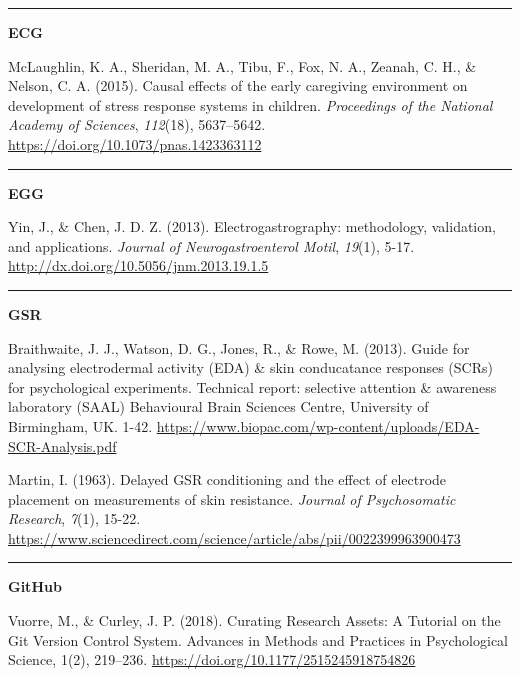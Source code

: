 \documentclass[]{book}
\begin{document}
\begin{center}\rule{0.5\linewidth}{0.5pt}\end{center}

\textbf{ECG}

McLaughlin, K. A., Sheridan, M. A., Tibu, F., Fox, N. A., Zeanah, C. H., \& Nelson, C. A. (2015). Causal effects of the early caregiving environment on development of stress response systems in children. \emph{Proceedings of the National Academy of Sciences}, \emph{112}(18), 5637--5642.\\
\url{https://doi.org/10.1073/pnas.1423363112}

\begin{center}\rule{0.5\linewidth}{0.5pt}\end{center}

\textbf{EGG}

Yin, J., \& Chen, J. D. Z. (2013). Electrogastrography: methodology, validation, and applications. \emph{Journal of Neurogastroenterol Motil}, \emph{19}(1), 5-17. \url{http://dx.doi.org/10.5056/jnm.2013.19.1.5}

\begin{center}\rule{0.5\linewidth}{0.5pt}\end{center}

\textbf{GSR}

Braithwaite, J. J., Watson, D. G., Jones, R., \& Rowe, M. (2013). Guide for analysing electrodermal activity (EDA) \& skin conducatance responses (SCRs) for psychological experiments. Technical report: selective attention \& awareness laboratory (SAAL) Behavioural Brain Sciences Centre, University of Birmingham, UK. 1-42. \url{https://www.biopac.com/wp-content/uploads/EDA-SCR-Analysis.pdf}

Martin, I. (1963). Delayed GSR conditioning and the effect of electrode placement on measurements of skin resistance. \emph{Journal of Psychosomatic Research}, \emph{7}(1), 15-22.\\
\url{https://www.sciencedirect.com/science/article/abs/pii/0022399963900473}

\begin{center}\rule{0.5\linewidth}{0.5pt}\end{center}

\textbf{GitHub}

Vuorre, M., \& Curley, J. P. (2018). Curating Research Assets: A Tutorial on the Git Version Control System. Advances in Methods and Practices in Psychological Science, 1(2), 219--236. \url{https://doi.org/10.1177/2515245918754826}


\end{document}

